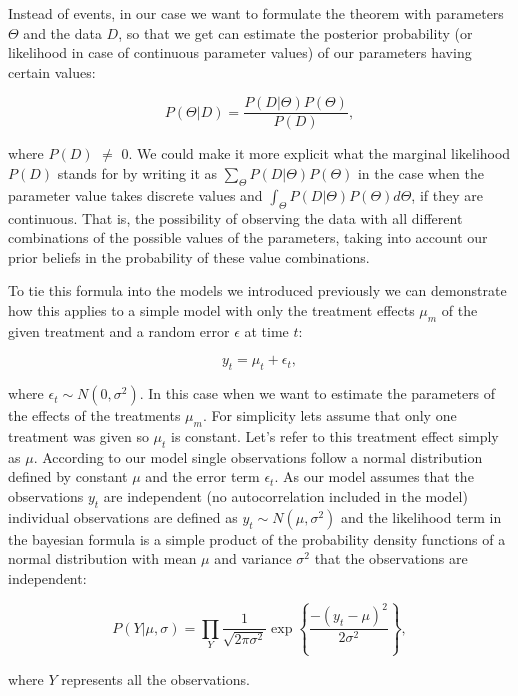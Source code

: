 \documentclass[12pt,a4paper,leqno]{report}
\theoremstyle{plain}
\theoremstyle{definition}
\theoremstyle{remark}
\begin{document}
Instead of events, in our case we want to formulate the theorem with parameters
\(\Theta \) and the data \(D\), so that we get can estimate the posterior
probability (or likelihood in case of continuous parameter values) of our
parameters having certain values:

\begin{def}\label{}
    \begin{equation}\label{bayeswithparams}
        P(\Theta|D) = \frac{P(D|\Theta)P(\Theta)}{P(D)},
    \end{equation}
\end{def}where \(P(D)\) \(\neq \) 0. We could make it more explicit what the marginal likelihood \(P(D)\) stands for
by writing it as \(\sum_\Theta P(D|\Theta)P(\Theta)\) in the case when the parameter
value takes discrete values and \(\int_\Theta P(D|\Theta)P(\Theta) d\Theta \),
if they are continuous. That is, the possibility of observing the data with all
different combinations of the possible values of the parameters, taking into
account our prior beliefs in the probability of these value combinations.

To tie this formula into the models we introduced previously we can demonstrate
how this applies to a simple model with only the treatment effects \(\mu_m \) of
the given treatment and a random error \(\epsilon \) at time \(t\):

\begin{def}\label{}
    \begin{equation}\label{}
        y_t = \mu_t + \epsilon_t,
    \end{equation}
\end{def}where \(\epsilon_{t} \sim N(0,\sigma^2)\). In this case when we want to estimate the parameters of the effects of the
treatments \(\mu_m\). For simplicity lets assume that only one treatment was
given so \(\mu_t\) is constant. Let's refer to this treatment effect simply as
\(\mu \). According to our model single observations follow a normal
distribution defined by constant \(\mu \) and the error term \(\epsilon_t \). As
our model assumes that the observations \(y_t\) are independent (no
autocorrelation included in the model) individual observations are defined as
\(y_t \sim N(\mu,\sigma^2) \) and the likelihood term in the bayesian formula is
a simple product of the probability density functions of a normal distribution
with mean \(\mu \) and variance \(\sigma^2 \) that the observations are
independent:

\begin{def}\label{}
    \begin{equation}\label{}
        P(Y|\mu, \sigma)
        =
        \prod_{Y}
        \frac{1}
        {{\sqrt {2\pi \sigma^2} }}
        \exp{ \left \{ \frac{-(y_t-\mu)^2} {2\sigma^2} \right \} },
    \end{equation}
\end{def}where \(Y\) represents all the observations.
\end{document}

